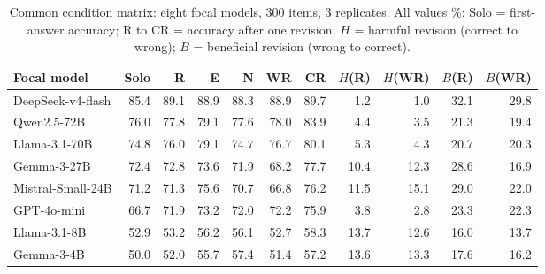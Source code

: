\begin{table}[t]
\centering
\caption{Common condition matrix: eight focal models, 300 items, 3 replicates. All values \%: Solo = first-answer accuracy; R to CR = accuracy after one revision; $H$ = harmful revision (correct to wrong); $B$ = beneficial revision (wrong to correct).}
\label{tab:x1}
\begin{adjustbox}{max width=\textwidth}
\small
\begin{tabular}{@{}lrrrrrrrrrr@{}}
\toprule
Focal model & Solo & R & E & N & WR & CR & $H$(R) & $H$(WR) & $B$(R) & $B$(WR) \\
\midrule
DeepSeek-v4-flash & 85.4 & 89.1 & 88.9 & 88.3 & 88.9 & 89.7 & 1.2 & 1.0 & 32.1 & 29.8 \\
Qwen2.5-72B & 76.0 & 77.8 & 79.1 & 77.6 & 78.0 & 83.9 & 4.4 & 3.5 & 21.3 & 19.4 \\
Llama-3.1-70B & 74.8 & 76.0 & 79.1 & 74.7 & 76.7 & 80.1 & 5.3 & 4.3 & 20.7 & 20.3 \\
Gemma-3-27B & 72.4 & 72.8 & 73.6 & 71.9 & 68.2 & 77.7 & 10.4 & 12.3 & 28.6 & 16.9 \\
Mistral-Small-24B & 71.2 & 71.3 & 75.6 & 70.7 & 66.8 & 76.2 & 11.5 & 15.1 & 29.0 & 22.0 \\
GPT-4o-mini & 66.7 & 71.9 & 73.2 & 72.0 & 72.2 & 75.9 & 3.8 & 2.8 & 23.3 & 22.3 \\
Llama-3.1-8B & 52.9 & 53.2 & 56.2 & 56.1 & 52.7 & 58.3 & 13.7 & 12.6 & 16.0 & 13.7 \\
Gemma-3-4B & 50.0 & 52.0 & 55.7 & 57.4 & 51.4 & 57.2 & 13.6 & 13.3 & 17.6 & 16.2 \\
\bottomrule
\end{tabular}
\end{adjustbox}
\end{table}
